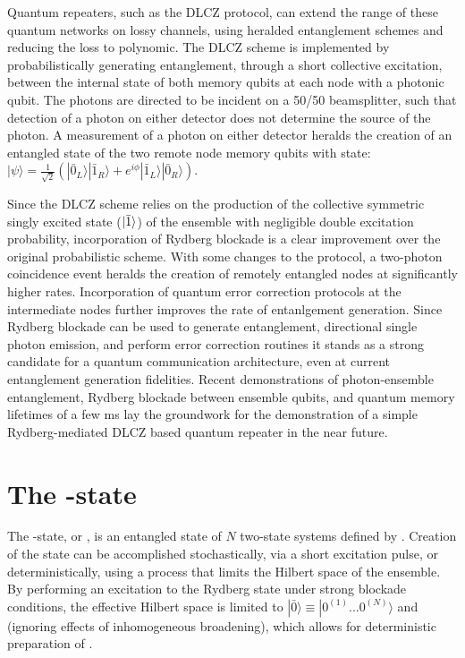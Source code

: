 Quantum repeaters, such as the DLCZ protocol\cite{DLCZ2001}, can extend the range of these quantum networks on lossy channels, using heralded entanglement schemes and reducing the loss to polynomic.
The DLCZ scheme is implemented by probabilistically generating entanglement, through a short collective excitation, between the internal state of both memory qubits at each node with a photonic qubit.
The photons are directed to be incident on a 50/50 beamsplitter, such that detection of a photon on either detector does not determine the source of the photon.
A measurement of a photon on either detector heralds the creation of an entangled state of the two remote node memory qubits with state: $|\psi\rangle=\frac{1}{\sqrt{2}}\left(|\bar{0}_L\rangle|\bar{1}_R\rangle+e^{i\phi}|\bar{1}_L\rangle|\bar{0}_R\rangle\right)$.

Since the DLCZ scheme relies on the production of the collective symmetric singly excited state ($|\bar{1}\rangle$) of the ensemble with negligible double excitation probability, incorporation of Rydberg blockade is a clear improvement over the original probabilistic scheme.
With some changes to the protocol, a two-photon coincidence event heralds the creation of remotely entangled nodes at significantly higher rates\cite{Zhao2010,Han2010}.
Incorporation of quantum error correction protocols at the intermediate nodes further improves the rate of entanlgement generation\cite{Fowler2010}.
Since Rydberg blockade can be used to generate entanglement, directional single photon emission, and perform error correction routines it stands as a strong candidate for a quantum communication architecture, even at current entanglement generation fidelities.
Recent demonstrations of photon-ensemble entanglement\cite{LiDudinKuzmich2013}, Rydberg blockade between ensemble qubits, and quantum memory lifetimes of a few ms\cite{EbertKwonWalkerEtAl2015} lay the groundwork for the demonstration of a simple Rydberg-mediated DLCZ based quantum repeater in the near future\cite{Solmeyer2016}.

\section{The \W{}-state}
The \W{}-state, or \bbar{}, is an entangled state of $N$ two-state systems defined by .
Creation of the \bbar{} state can be accomplished stochastically, via a short excitation pulse\cite{Haas180}, or deterministically, using a process that limits the Hilbert space of the ensemble.
By performing an excitation to the Rydberg state under strong blockade conditions, the effective Hilbert space is limited to $|\bar{0}\rangle \equiv |0^{(1)}...0^{(N)}\rangle$ and \bbar{} (ignoring effects of inhomogeneous broadening), which allows for deterministic preparation of \bbar{}.

